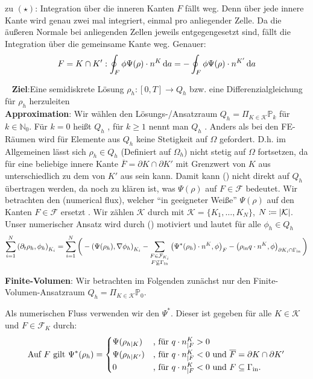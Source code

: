 \begin{remark}
	zu $ (\star) $: Integration über die inneren Kanten $ F $ fällt weg. Denn über jede innere Kante wird genau zwei mal integriert, einmal pro anliegender Zelle. Da die äußeren Normale bei anliegenden Zellen jeweils entgegengesetzt sind, fällt die Integration über die gemeinsame Kante weg. Genauer:
	\[ F = K \cap K': \oint_{F}  \phi \Psi(\rho) \cdot n^K \mathop{}\!\mathrm{d} a = - \oint_{F} \phi \Psi(\rho) \cdot n^{K'} \mathop{}\!\mathrm{d} a\]
\end{remark}
\ \newline
\textbf{Ziel}:Eine semidiskrete Lösung $ \rho_h: [0,T] \to Q_h $ bzw. eine Differenzialgleichung für $ \rho_h $ herzuleiten\\
\textbf{Approximation}:
Wir wählen den Lösungs-/Ansatzraum $ Q_h = \Pi_{K\in\mathcal{K}} \mathbb{P}_k $ für $ k \in \mathbb{N}_0 $. Für $ k = 0 $ heißt $ Q_h $ , für $ k \geq 1 $ nennt man $ Q_h $ . Anders als bei den FE-Räumen wird für Elemente aus $ Q_h $ keine Stetigkeit auf $ \Omega $ gefordert. D.h. im Allgemeinen lässt sich $ \rho_h \in Q_h $ (Definiert auf $ \Omega_h $) nicht stetig auf $ \Omega $ fortsetzen, da für eine beliebige innere Kante $ \overline{F} = \partial K \cap \partial K' $ mit Grenzwert von $ K $ aus unterschiedlich zu dem von $ K' $ aus sein kann. Damit kann (\sun) nicht direkt auf $ Q_h $ übertragen werden, da noch zu klären ist, was $ \Psi(\rho) $ auf $ F \in \mathcal{F} $ bedeutet. Wir betrachten den  (numerical flux), welcher \enquote{in geeigneter Weiße} $ \Psi(\rho) $ auf den Kanten $ F \in \mathcal{F} $ ersetzt . Wir zählen $ \mathcal{K} $ durch mit $ \mathcal{K} = \{K_1 , \dots , K_N\} $, $ N \coloneqq \abs{\mathcal{K}} $.
Unser numerischer Ansatz wird durch (\sun) motiviert und lautet für alle $ \phi_h \in Q_h $
\[
\sum_{i = 1}^{N} \left(\partial_t \rho_h, \phi_h  \right)_{K_i}  = \sum_{i=1}^{N} \bigg(- \left(\Psi(\rho_h), \nabla\phi_h \right)_{K_i} -\sum_{\substack{F \in \mathcal{F}_{K_i} \\ F \not\subseteq \Gamma_{{\text{in}}}}} \left(\Psi^*(\rho_h) \cdot n^K, \phi \right)_{F} - \left(\rho_{\text{in}} q \cdot n^K, \phi \right)_{\partial K_i \cap \Gamma_{{\text{in}}}} \bigg)
\]



\textbf{Finite-Volumen}:
Wir betrachten im Folgenden zunächst nur den Finite-Volumen-Ansatzraum $ Q_h = \Pi_{K \in \mathcal{K}} \mathbb{P}_0 $. 

Als numerischen Fluss verwenden wir den  $ \Psi^* $. Dieser ist gegeben für alle $ K \in \mathcal{K} $ und $ F \in \mathcal{F}_K $ durch:
\begin{gather*}
	\text{Auf } F \text{ gilt }\Psi^*(\rho_h) = \begin{cases}
	\Psi(\rho_{h|K}) &\text{, für } q \cdot n^K_{|F} > 0\\
	\Psi(\rho_{h|K'}) &\text{, für } q\cdot n^K_{|F} < 0 \text{ und } \overline{F} = \partial K \cap \partial K'\\
	0 &\text{, für } q\cdot n^K_{|F} < 0 \text{ und } F \subseteq \Gamma_{{\text{in}}}. 
	\end{cases}  
\end{gather*}


